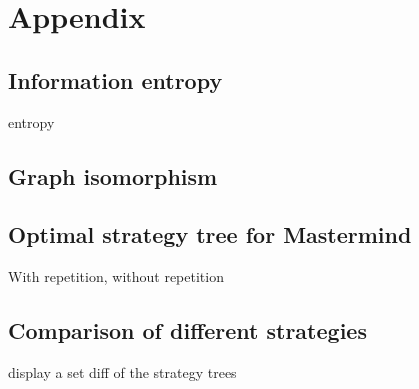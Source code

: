 \section{Appendix}

\subsection{Information entropy}

entropy

\subsection{Graph isomorphism}

\subsection{Optimal strategy tree for Mastermind}

With repetition, without repetition

\subsection{Comparison of different strategies}

display a set diff of the strategy trees